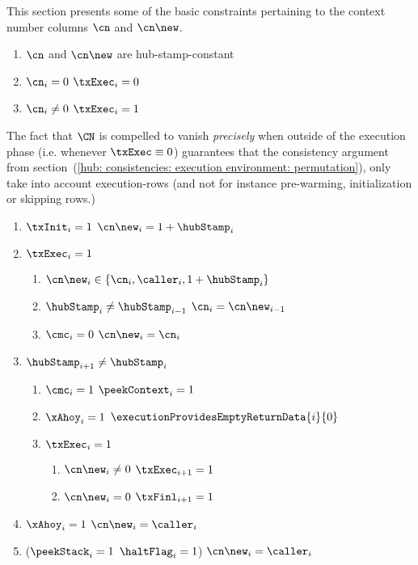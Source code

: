 This section presents some of the basic constraints pertaining to the context number columns $\cn$ and $\cn\new$.
\begin{enumerate}
	\item $\cn$ and $\cn\new$ are hub-stamp-constant
	\item \If $\cn _{i} =    0$ \Then $\txExec_{i} = 0$
	\item \If $\cn _{i} \neq 0$ \Then $\txExec_{i} = 1$
\end{enumerate}
\saNote{} \label{hub: generalities: context: vanishing of context number outside of the execution phase}
The fact that $\CN$ is compelled to vanish \emph{precisely} when outside of the execution phase (i.e. whenever $\txExec \equiv 0$)
guarantees that the consistency argument from section~(\ref{hub: consistencies: execution environment: permutation}),
only take into account execution-rows (and not for instance pre-warming, initialization or skipping rows.)
\begin{enumerate}[resume]
	\item \If $\txInit_{i} = 1$ \Then $\cn\new _{i} = 1 + \hubStamp_{i}$
	\item \If $\txExec_{i} = 1$ \Then 
		\begin{enumerate}
			\item\label{next context number}
				$\cn\new_{i} \in \{ \cn_{i}, \caller_{i}, 1 + \hubStamp_{i} \}$
			\item \If $\hubStamp_{i} \neq \hubStamp_{i - 1}$ \Then $\cn_{i} = \cn\new_{i - 1}$
			\item \If $\cmc_{i} = 0$ \Then $\cn\new_{i} = \cn_{i}$
		\end{enumerate}
	\item \If $\hubStamp_{i + 1} \neq \hubStamp_{i}$ \Then
		\begin{enumerate}
			\item \label{hub: generalities: context: whenever the context may change the final row is a context row}
				\If $\cmc_{i}    = 1$ \Then $\peekContext_{i} = 1$
			\item \label{hub: generalities: context: exceptions lead to providing empty return data}
				\If $\xAhoy_{i}  = 1$ \Then $\executionProvidesEmptyReturnData {i}{0} $
			\item \label{hub: generalities: context: how to trigger finalization phase} \If $\txExec_{i} = 1$
				\begin{enumerate}
				        \item \If $\cn\new_{i} \neq 0$ \Then $\txExec_{i + 1} = 1$
				        \item \If $\cn\new_{i} =    0$ \Then $\txFinl_{i + 1} = 1$
				\end{enumerate}
		\end{enumerate}
	\item \If $\xAhoy_{i} = 1$ \Then $\cn\new_{i} = \caller_{i}$
	\item \If \big($\peekStack_{i} = 1$ \et $\haltFlag_{i} = 1$\big) \Then $\cn\new_{i} = \caller_{i}$
\end{enumerate}

